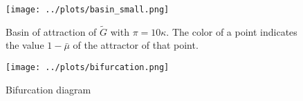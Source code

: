 \documentclass[../../main.tex]{subfiles}
\begin{document}
\begin{figure}[H]
  \centering
  \texttt{[image: ../plots/basin\_small.png]}
  \caption{Basin of attraction of $\tilde{G}$ with $\pi = 10 \kappa$. The color of a point indicates the value $1 - \bar{\mu}$ of the attractor of that point.}
  \label{fig:two-dimensional:basin}
\end{figure}

\begin{figure}[H]
  \centering
  \texttt{[image: ../plots/bifurcation.png]}
  \caption{Bifurcation diagram }
  \label{fig:two-dimensional:bifurcation}
\end{figure}
\end{document}
